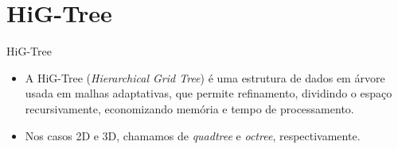 \documentclass[../main/main.tex]{subfiles}
\begin{document}
\section{HiG-Tree}
\begin{frame}{HiG-Tree}
    \begin{itemize}
        \item A HiG-Tree (\textit{Hierarchical Grid Tree}) é uma estrutura de dados em árvore usada em malhas adaptativas, que permite refinamento, dividindo o espaço recursivamente, economizando memória e tempo de processamento.

        \item Nos casos 2D e 3D, chamamos de \textit{quadtree} e \textit{octree}, respectivamente.
    \end{itemize}
\end{frame}
\end{document}
